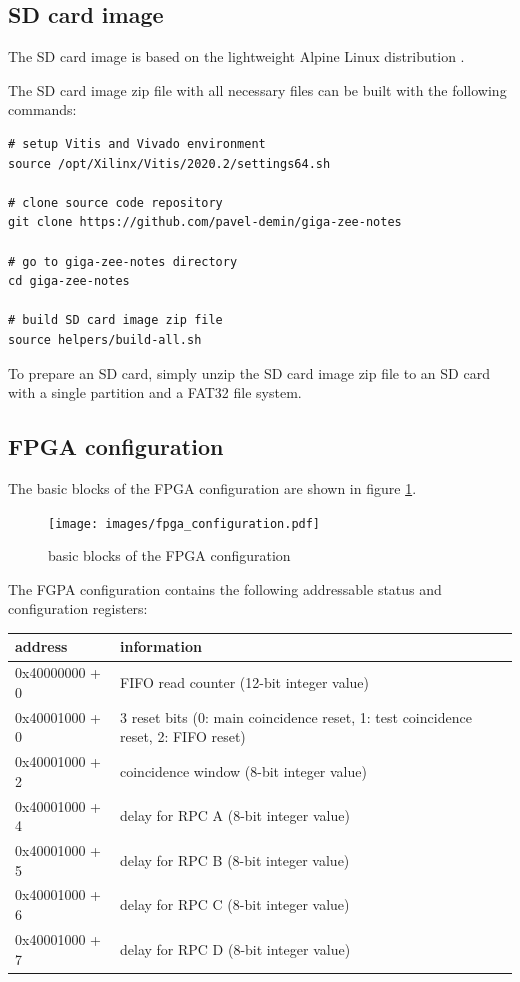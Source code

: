 \documentclass[12pt, a4paper]{article}
\begin{document}
\subsection{SD card image}

The SD card image is based on the lightweight Alpine Linux distribution \cite{alpine}.

The SD card image zip file with all necessary files can be built with the following commands:
\vspace{-1ex}
\begin{verbatim}
# setup Vitis and Vivado environment
source /opt/Xilinx/Vitis/2020.2/settings64.sh

# clone source code repository
git clone https://github.com/pavel-demin/giga-zee-notes

# go to giga-zee-notes directory
cd giga-zee-notes

# build SD card image zip file
source helpers/build-all.sh
\end{verbatim}

To prepare an SD card, simply unzip the SD card image zip file to an SD card with a single partition and a FAT32 file system.

\subsection{FPGA configuration}

The basic blocks of the FPGA configuration are shown in figure \ref{fig:fpga_configuration}.

\begin{figure}[h!]
  \centering
  \texttt{[image: images/fpga\_configuration.pdf]}
  \caption{basic blocks of the FPGA configuration}
  \label{fig:fpga_configuration}
\end{figure}

The FGPA configuration contains the following addressable status and configuration registers:
\begin{center}
  \begin{tabular}{|l|l|}
  \hline
  \textbf{address} & \textbf{information} \\
  \hline
  0x40000000 + 0 & FIFO read counter (12-bit integer value) \\
  \hline
  0x40001000 + 0 & 3 reset bits (0: main coincidence reset, 1: test coincidence reset, 2: FIFO reset) \\
  \hline
  0x40001000 + 2 & coincidence window (8-bit integer value) \\
  \hline
  0x40001000 + 4 & delay for RPC A (8-bit integer value) \\
  \hline
  0x40001000 + 5 & delay for RPC B (8-bit integer value) \\
  \hline
  0x40001000 + 6 & delay for RPC C (8-bit integer value) \\
  \hline
  0x40001000 + 7 & delay for RPC D (8-bit integer value) \\
  \hline
  \end{tabular}
\end{center}
\end{document}
